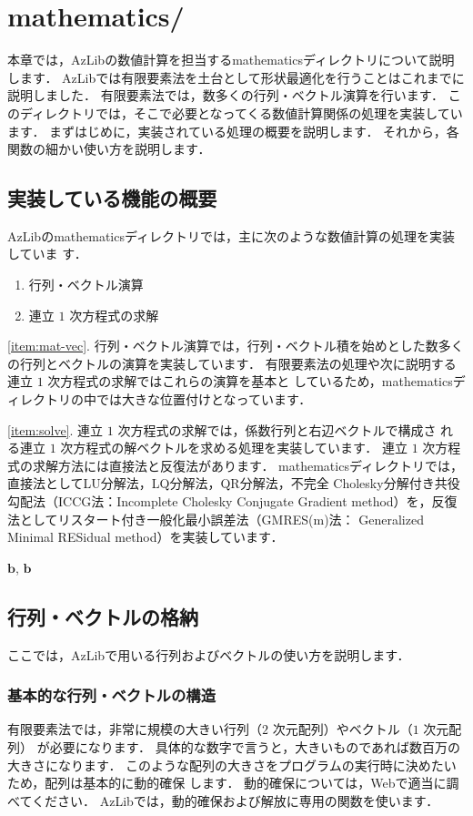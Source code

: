 \chapter{mathematics/} \label{chap:mathematics}

本章では，AzLibの数値計算を担当するmathematicsディレクトリについて説明します．
AzLibでは有限要素法を土台として形状最適化を行うことはこれまでに説明しました．
有限要素法では，数多くの行列・ベクトル演算を行います．
このディレクトリでは，そこで必要となってくる数値計算関係の処理を実装しています．
まずはじめに，実装されている処理の概要を説明します．
それから，各関数の細かい使い方を説明します．


\section{実装している機能の概要}
AzLibのmathematicsディレクトリでは，主に次のような数値計算の処理を実装していま
す．
\begin{enumerate}
	\item \label{item:mat-vec} 行列・ベクトル演算
	\item \label{item:solve} 連立 $1$ 次方程式の求解
\end{enumerate}

\ref{item:mat-vec}. 行列・ベクトル演算では，行列・ベクトル積を始めとした数多く
の行列とベクトルの演算を実装しています．
有限要素法の処理や次に説明する連立 $1$ 次方程式の求解ではこれらの演算を基本と
しているため，mathematicsディレクトリの中では大きな位置付けとなっています．

\ref{item:solve}. 連立 $1$ 次方程式の求解では，係数行列と右辺ベクトルで構成さ
れる連立 $1$ 次方程式の解ベクトルを求める処理を実装しています．
連立 $1$ 次方程式の求解方法には直接法と反復法があります．
mathematicsディレクトリでは，直接法としてLU分解法，LQ分解法，QR分解法，不完全
Cholesky分解付き共役勾配法（ICCG法：Incomplete Cholesky Conjugate Gradient 
method）を，反復法としてリスタート付き一般化最小誤差法（GMRES(m)法：
Generalized Minimal RESidual method）を実装しています．

$\boldsymbol{b}$, $\bm{b}$


\section{行列・ベクトルの格納}

ここでは，AzLibで用いる行列およびベクトルの使い方を説明します．

\subsection{基本的な行列・ベクトルの構造}
有限要素法では，非常に規模の大きい行列（$2$ 次元配列）やベクトル（$1$ 次元配列）
が必要になります．
具体的な数字で言うと，大きいものであれば数百万の大きさになります．
このような配列の大きさをプログラムの実行時に決めたいため，配列は基本的に動的確保
します．
動的確保については，Webで適当に調べてください．
AzLibでは，動的確保および解放に専用の関数を使います．

